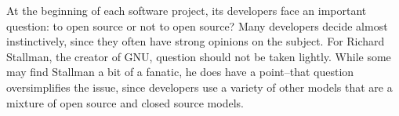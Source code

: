 At the beginning of each software project, its developers face an important
question: to open source or not to open source? Many developers decide almost
instinctively, since they often have strong opinions on the subject. For Richard
Stallman, the creator of GNU, question should not be taken lightly. While some
may find Stallman a bit of a fanatic, he does have a point--that
question oversimplifies the issue, since developers use a variety of other
models that are a mixture of open source and closed source models.
